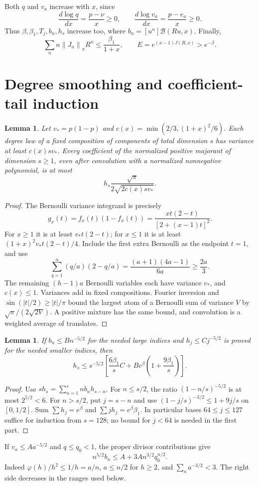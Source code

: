 \documentclass[11pt]{article}
\newtheorem{lemma}[theorem]{Lemma}
\theoremstyle{remark}\newtheorem{remark}[theorem]{Remark}
\newcommand{\Bcal}{\mathcal B}
\newcommand{\norm}[1]{\left\|#1\right\|_x}
\begin{document}
Both $q$ and $v_a$ increase with $x$, since
\[
 \frac{d\log q}{dx}=\frac{p-\nu}{x}\ge0,\qquad
 \frac{d\log v_a}{dx}=\frac{p-e_a}{x}\ge0.
\]
Thus $\beta,\beta_1,T_j,b_n,h_s$ increase too, where
$b_n=[u^n]\Bcal(Ru,x)$.
Finally,
\begin{equation}\label{eq:Jmoment}
 \sum_n n\norm{J_n}R^n\le\frac{\beta_1}{1+x},\qquad
 E=e^{(x-1)J(R,x)}>e^{-\beta}.
\end{equation}

\section{Degree smoothing and coefficient-tail induction}\label{sec:smoothing}
\begin{lemma}\label{lem:smoothing}
Let $v_*=p(1-p)$ and
$c(x)=\min(2/3,(1+x)^2/6)$. Each degree law of a fixed composition of
components of total dimension $s$ has variance at least $c(x)s v_*$.
Every coefficient of the normalized positive majorant of dimension $s\ge1$,
even after convolution with a normalized nonnegative polynomial, is at most
\[
 h_s\frac{\sqrt\pi}{2\sqrt{2c(x)s v_*}}.
\]
\end{lemma}
\begin{proof}
The Bernoulli variance integrand is precisely
\[
 g_x(t)=f_x(t)(1-f_x(t))
       =\frac{xt(2-t)}{[2+(x-1)t]^2}.
\]
For $x\ge1$ it is at least $v_*t(2-t)$; for $x\le1$ it is at least
$(1+x)^2v_*t(2-t)/4$. Include the first extra Bernoulli as the endpoint
$t=1$, and use
\[
 \sum_{q=1}^a(q/a)(2-q/a)=\frac{(a+1)(4a-1)}{6a}\ge\frac{2a}{3}.
\]
The remaining $(h-1)a$ Bernoulli variables each have variance $v_*$,
and $c(x)\le1$. Variances add in fixed compositions. Fourier inversion and
$\sin(|t|/2)\ge |t|/\pi$ bound the largest atom of a Bernoulli sum of variance
$V$ by $\sqrt\pi/(2\sqrt{2V})$. A positive mixture has the same bound,
and convolution is a weighted average of translates.
\end{proof}

\begin{lemma}\label{lem:induction}
If $b_n\le Bn^{-5/2}$ for the needed large indices and $h_j\le Cj^{-5/2}$
is proved for the needed smaller indices, then
\begin{equation}\label{eq:induction}
 h_s\le s^{-5/2}\left[
  \frac{6\beta_1}{s}C+Be^\beta\left(1+\frac{9\beta_1}{s}\right)\right].
\end{equation}
\end{lemma}
\begin{proof}
Use $s h_s=\sum_{n=1}^s n b_nh_{s-n}$. For $n\le s/2$, the ratio
$(1-n/s)^{-5/2}$ is at most $2^{5/2}<6$. For $n>s/2$, put $j=s-n$
and use $(1-j/s)^{-3/2}\le1+9j/s$ on $[0,1/2]$.
Sum $\sum h_j=e^\beta$ and $\sum jh_j=e^\beta\beta_1$.
In particular bases $64\le j\le127$ suffice for induction from $s=128$;
no bound for $j<64$ is needed in the first part.
\end{proof}
If $v_a\le Aa^{-5/2}$ and $q\le q_0<1$, the proper divisor contributions give
\begin{equation}\label{eq:b-tail}
 n^{5/2}b_n\le A+3A n^{3/2}q_0^{n/2}.
\end{equation}
Indeed $\varphi(h)/h^2\le1/h=a/n$, $a\le n/2$ for $h\ge2$, and
$\sum_a a^{-3/2}<3$. The right side decreases in the ranges used below.
\end{document}

